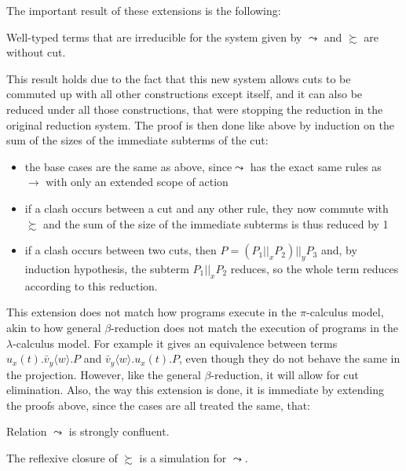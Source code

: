 The important result of these extensions is the following:

\begin{proposition}
Well-typed terms that are irreducible for the system given by $\leadsto$ and $\succsim$ are without cut.
\end{proposition}

\begin{myproof}
This result holds due to the fact that this new system allows cuts to be commuted up with all other constructions except itself, and it can also be reduced under all those constructions, that were stopping the reduction in the original reduction system.
The proof is then done like above by induction on the sum of the sizes of the immediate subterms of the cut:
\begin{itemize}
	\item the base cases are the same as above, since$\leadsto$ has the exact same rules as $\to$ with only an extended scope of action
	\item if a clash occurs between a cut and any other rule, they now commute with $\succsim$ and the sum of the size of the immediate subterms is thus reduced by 1
	\item if a clash occurs between two cuts, then $P=(P_1||_xP_2)||_yP_3$ and, by induction hypothesis, the subterm $P_1||_xP_2$ reduces, so the whole term reduces according to this reduction.
\end{itemize}
\end{myproof}

This extension does not match how programs execute in the $\pi$-calculus model, akin to how general $\beta$-reduction does not match the execution of programs in the $\lambda$-calculus model. For example it gives an equivalence between terms $u_x(t).\bar{v}_y\langle w\rangle.P$ and $\bar{v}_y\langle w\rangle.u_x(t).P$, even though they do not behave the same in the projection. However, like the general $\beta$-reduction, it will allow for cut elimination. Also, the way this extension is done, it is immediate by extending the proofs above, since the cases are all treated the same, that:

\begin{proposition}
Relation $\leadsto$ is strongly confluent.
\end{proposition}

\begin{proposition}
The reflexive closure of $\succsim$ is a simulation for $\leadsto$.
\end{proposition}

